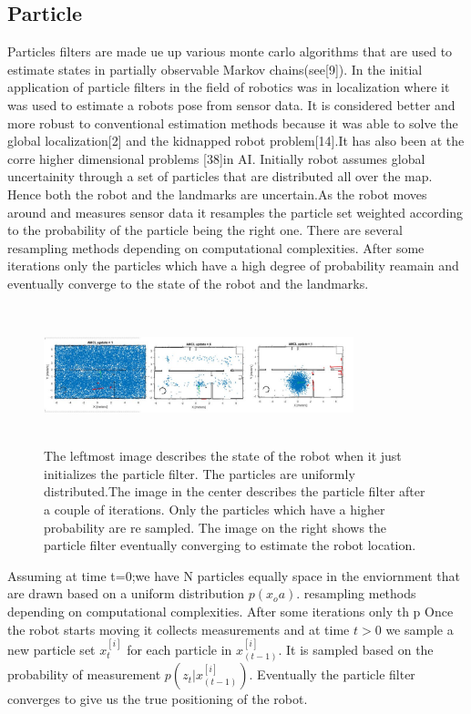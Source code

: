 \documentclass[conference]{IEEEtran}
\begin{document}
\subsection{Particle}      %
Particles filters are made ue up various monte carlo algorithms that are used to estimate states in partially observable Markov chains(see[9]). In the initial application of particle filters in the field of robotics was in localization where it was used to estimate a robots pose from sensor data. It is considered better and more robust to conventional estimation methods because it was able to solve the global localization[2] and the kidnapped robot problem[14].It has also been at the corre higher dimensional problems [38]in AI.  
Initially robot assumes global uncertainity through a set of particles that are distributed all over the map. Hence both the robot and the landmarks are uncertain.As the robot moves around and measures sensor data it resamples the particle set weighted according to the probability of the particle being the right one. There are several resampling methods depending on computational complexities. After some iterations only the particles which have a high degree of probability  reamain and eventually converge to the state of the robot and the landmarks.
\begin{figure}[h!]
	\centering
	\includegraphics[height=40mm,width=90mm]{Particle_filter_method.JPG}
	\caption{The leftmost image describes the state of the robot when it just initializes the particle filter. The particles are uniformly distributed.The image in the center describes the particle filter after a couple of iterations. Only the particles which have a higher probability are re sampled. The image on the right shows the particle filter eventually converging to estimate the robot location. }
	
\end{figure}
Assuming at time t=0;we have N particles equally space in the enviornment that are drawn based on a uniform distribution $ p(x_oa)$.                                                                        resampling methods depending on computational complexities. After some iterations only th   p
Once the robot starts moving it collects measurements and at time $t>0$ we sample a new particle set $x^{[i]}_t$ for each particle in $x^{[i]}_{(t-1)}$. It is sampled based on the probability of measurement $p(z_t|x^{[i]}_{(t-1)})$. Eventually the particle filter converges to give us the true positioning of the robot.
\end{document}
